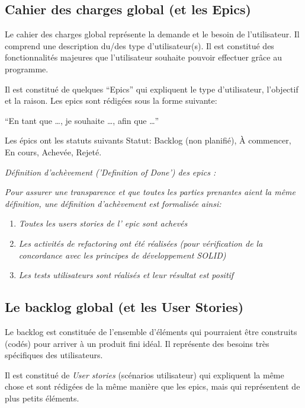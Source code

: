 \subsection{Cahier des charges global (et les Epics)}
Le cahier des charges global représente la demande et le besoin de l’utilisateur. 
Il comprend une description du/des type d’utilisateur(s). Il est constitué des fonctionnalités majeures 
que l’utilisateur souhaite pouvoir effectuer grâce au programme. 

Il est constitué de quelques “Epics” qui expliquent le type d’utilisateur, l’objectif et la raison. 
Les epics sont rédigées sous la forme suivante:

“En tant que …, je souhaite …, afin que …” 

Les épics ont les statuts suivants Statut: Backlog (non planifié), À commencer, En cours, Achevée, Rejeté.\\



\noindent%
\hfill%
\begin{minipage}{12cm}
      \textsl{Définition d'achèvement ('Definition of Done') des epics :}

      \textsl{Pour assurer une transparence et que toutes les parties prenantes aient la même définition, 
une définition d'achèvement est formalisée ainsi:}
\begin{enumerate}     
      \item  \textsl{Toutes les users stories de l' epic sont achevés}
      \item  \textsl{Les activités de refactoring ont été réalisées (pour vérification de la concordance 
      avec les principes de développement SOLID)}
      \item  \textsl{Les tests utilisateurs sont réalisés et leur résultat est positif}
\end{enumerate}
\end{minipage}

\subsection{Le backlog global (et les User Stories)}

Le backlog est constituée de l’ensemble d'éléments qui pourraient être construits (codés) pour arriver 
à un produit fini idéal. Il représente des besoins très spécifiques des utilisateurs. 

Il est constitué de \emph{User stories} (scénarios utilisateur) qui expliquent la même chose et 
sont rédigées de la même manière que les epics, mais qui représentent de plus petits éléments.

